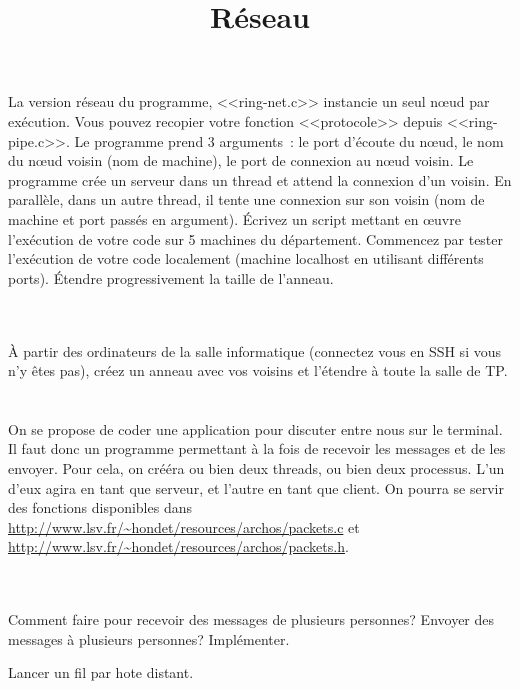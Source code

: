 \documentclass{exam}
\title{Réseau}
\date{}
\begin{document}
\maketitle
\begin{questions}
\begin{parts}
  \part{} La version réseau du programme, <<ring-net.c>> instancie un
  seul n\oe{}ud par exécution. Vous pouvez recopier votre fonction
  <<protocole>> depuis <<ring-pipe.c>>.
  Le programme prend 3 arguments~: le port d'écoute du n\oe{}ud, le nom du nœud voisin (nom de
  machine), le port de connexion au nœud voisin. Le programme crée un
  serveur dans un thread et attend la connexion d'un voisin. En
  parallèle, dans un autre thread, il tente une connexion sur son
  voisin (nom de machine et port passés en argument). Écrivez un
  script mettant en œuvre l'exécution de votre code sur 5 machines du
  département. Commencez par tester l'exécution de votre code
  localement (machine localhost en utilisant différents
  ports). Étendre progressivement la taille de l'anneau.
  \begin{solution}
    \inputminted{C}{../12_13/correc/ring/ring-net.c}
  \end{solution}
  \part{} À partir des ordinateurs de la salle informatique
  (connectez vous en SSH si vous n'y êtes pas),
  créez un anneau avec vos voisins et l'étendre à toute la
  salle de TP.
\end{parts}

\begin{parts}
  \part{}
On se propose de coder une application pour discuter entre nous sur le terminal.
Il faut donc un programme permettant à la fois de recevoir les messages et de
les envoyer. Pour cela, on crééra ou bien deux threads, ou bien deux processus.
L'un d'eux agira en tant que serveur, et l'autre en tant que client. On pourra
se servir des fonctions disponibles dans
\url{http://www.lsv.fr/~hondet/resources/archos/packets.c} et
\url{http://www.lsv.fr/~hondet/resources/archos/packets.h}.
\begin{solution}
  \inputminted{C}{chat/client.c}
\end{solution}

  \part{}
  Comment faire pour recevoir des messages de plusieurs personnes? Envoyer des
  messages à plusieurs personnes? Implémenter.
\begin{solution}
  Lancer un fil par hote distant.
\end{solution}
\end{parts}
\end{questions}
\end{document}
